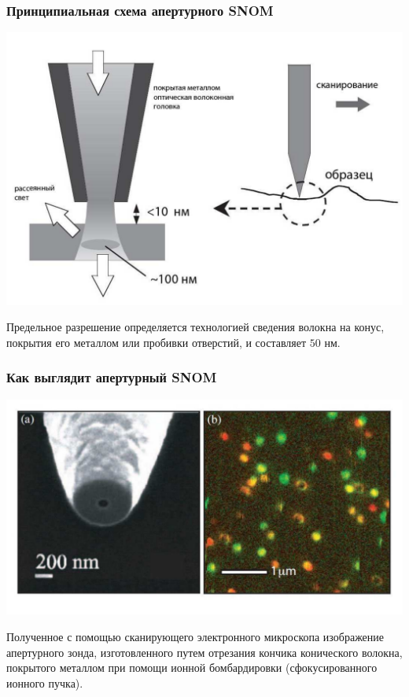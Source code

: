 \documentclass[9pt, compress, xcolor=table]{beamer}
\begin{document}
\begin{frame}[fragile]
\frametitle{Принципиальная схема апертурного SNOM}

\begin{center}
\includegraphics[scale=0.3]{apert}
\end{center}

Предельное разрешение определяется технологией сведения волокна
на конус, покрытия его металлом или пробивки отверстий, и
составляет $50$ нм.

\end{frame}

\begin{frame}[fragile]
\frametitle{Как выглядит апертурный SNOM}

\begin{center}
\includegraphics[scale=0.3]{probe}
\end{center}

Полученное с помощью сканирующего электронного микроскопа изображение апертурного зонда,
изготовленного путем отрезания кончика конического волокна, покрытого металлом при помощи ионной
бомбардировки  (сфокусированного ионного пучка).

\end{frame}
\end{document}
